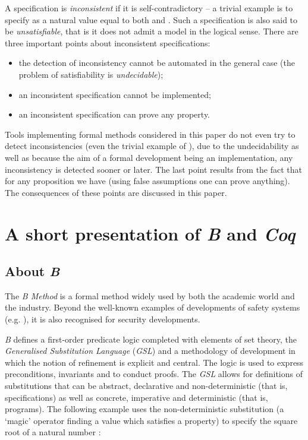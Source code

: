 \documentclass[conference]{IEEEtran}
\begin{document}
A specification is \emph{inconsistent} if it is self-contradictory -- a trivial example is to
specify {\small} as a natural value equal to both {\small} and {\small}. Such a
specification is also said to be \emph{unsatisfiable}, that is it does not admit a model in
the logical sense. There are three important points about inconsistent specifications:
\begin{itemize}
\item the detection of inconsistency cannot be automated in the general case (the problem of
satisfiability is \emph{undecidable});
\item an inconsistent specification cannot be implemented;
\item an inconsistent specification can prove any property.
\end{itemize}
Tools implementing formal methods considered in this paper do not even try to detect
inconsistencies (even the trivial example of {\small}), due to the
undecidability as well as because the aim of a formal development being an implementation, any
inconsistency is detected sooner or later. The last point results from the fact that for any
proposition {\small} we have {\small} (using false assumptions
one can prove anything). The consequences of these points are discussed in this paper.

\section{A short presentation of \emph{B} and \emph{Coq}}\label{intro_B_Coq}

\subsection{About \emph{B}}\label{B}

The \emph{B Method} \cite{abr:1} is a formal method widely used by both the academic world and
the industry. Beyond the well-known examples of developments of safety systems (e.g.
\cite{beh:1}), it is also recognised for security developments.

\emph{B} defines a first-order predicate logic completed with elements of set theory, the
\emph{Generalised Substitution Language} (\emph{GSL}) and a methodology of development in
which the notion of refinement is explicit and central. The logic is used to express
preconditions, invariants and to conduct proofs. The \emph{GSL} allows for definitions of
substitutions that can be abstract, declarative and  non-deterministic (that is,
specifications) as well as concrete, imperative and deterministic (that is, programs). The
following example uses the non-deterministic substitution  {\small} (a `magic'
operator finding a value which satisfies a property) to specify the square root of a natural
number {\small}:
\end{document}
